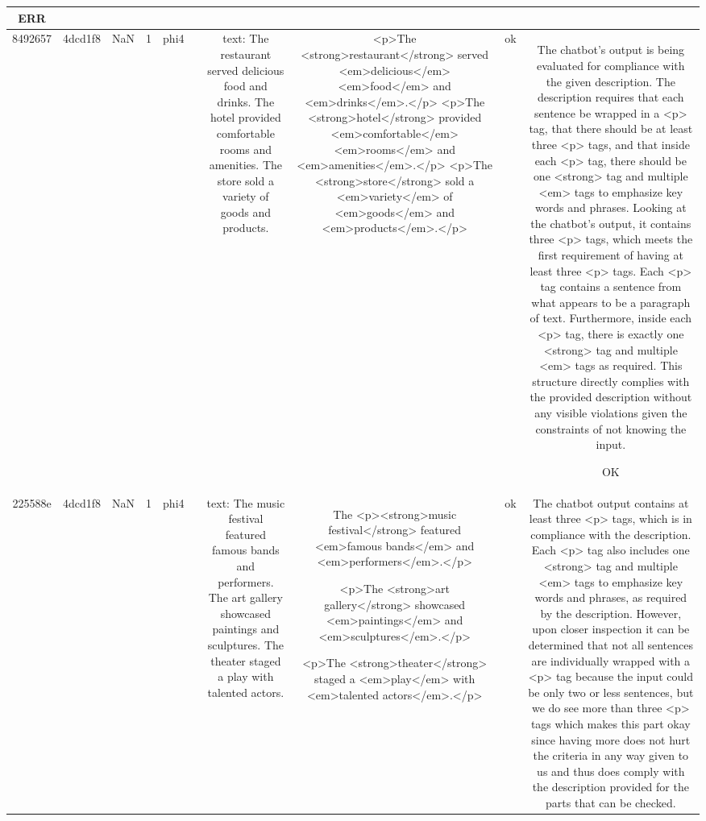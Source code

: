 \begin{table}[h!]
\begin{tabular}{|c|c|c|c|c|c|c|c|c|c|}
ERR\\
\hline
8492657 & 4dcd1f8 & NaN & 1 & phi4 &  & text: The restaurant served delicious food and drinks. The hotel provided comfortable rooms and amenities. The store sold a variety of goods and products. & <p>The <strong>restaurant</strong> served <em>delicious</em> <em>food</em> and <em>drinks</em>.</p>
<p>The <strong>hotel</strong> provided <em>comfortable</em> <em>rooms</em> and <em>amenities</em>.</p>
<p>The <strong>store</strong> sold a <em>variety</em> of <em>goods</em> and <em>products</em>.</p> & ok & The chatbot's output is being evaluated for compliance with the given description. The description requires that each sentence be wrapped in a <p> tag, that there should be at least three <p> tags, and that inside each <p> tag, there should be one <strong> tag and multiple <em> tags to emphasize key words and phrases. Looking at the chatbot's output, it contains three <p> tags, which meets the first requirement of having at least three <p> tags. Each <p> tag contains a sentence from what appears to be a paragraph of text. Furthermore, inside each <p> tag, there is exactly one <strong> tag and multiple <em> tags as required. This structure directly complies with the provided description without any visible violations given the constraints of not knowing the input.

OK\\
\hline
225588e & 4dcd1f8 & NaN & 1 & phi4 &  & text: The music festival featured famous bands and performers. The art gallery showcased paintings and sculptures. The theater staged a play with talented actors. & The <p><strong>music festival</strong> featured <em>famous bands</em> and <em>performers</em>.</p>

<p>The <strong>art gallery</strong> showcased <em>paintings</em> and <em>sculptures</em>.</p>

<p>The <strong>theater</strong> staged a <em>play</em> with <em>talented actors</em>.</p> & ok & The chatbot output contains at least three <p> tags, which is in compliance with the description. Each <p> tag also includes one <strong> tag and multiple <em> tags to emphasize key words and phrases, as required by the description. However, upon closer inspection it can be determined that not all sentences are individually wrapped with a <p> tag because the input could be only two or less sentences, but we do see more than three <p> tags which makes this part okay since having more does not hurt the criteria in any way given to us and thus does comply with the description provided for the parts that can be checked. 


\end{tabular}
\end{table}
